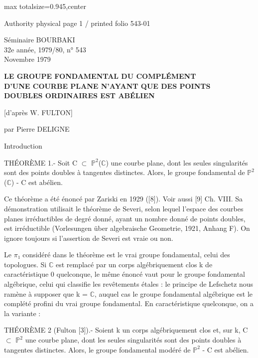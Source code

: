 \documentclass[10pt,a4paper]{article}
\begin{document}
\fontsize{8.05}{9.15}\selectfont
\noindent\begin{adjustbox}{max totalsize={\textwidth}{0.945\textheight},center}
\begin{minipage}{\textwidth}
\noindent\hfill\scriptsize Authority physical page 1 / printed folio 543-01\par\normalsize
\begin{center}Séminaire BOURBAKI\\32e année, 1979/80, n° 543\\Novembre 1979\end{center}
\begin{center}\bfseries LE GROUPE FONDAMENTAL DU COMPLÉMENT\\D'UNE COURBE PLANE N'AYANT QUE DES POINTS\\DOUBLES ORDINAIRES EST ABÉLIEN\end{center}
\begin{center}[d'après W. FULTON]\end{center}
\begin{center}par Pierre DELIGNE\end{center}
\noindent Introduction\par\smallskip
\noindent THÉORÈME 1.- Soit C \ensuremath{⊂} \ensuremath{ℙ^2}(\ensuremath{ℂ}) une courbe plane, dont les seules singularités sont des points doubles à tangentes distinctes. Alors, le groupe fondamental de \ensuremath{ℙ^2}(\ensuremath{ℂ}) - C est abélien.\par\smallskip
\noindent Ce théorème a été énoncé par Zariski en 1929 ([8]). Voir aussi [9] Ch. VIII. Sa démonstration utilisait le théorème de Severi, selon lequel l'espace des courbes planes irréductibles de degré donné, ayant un nombre donné de points doubles, est irréductible (Vorlesungen über algebraische Geometrie, 1921, Anhang F). On ignore toujours si l'assertion de Severi est vraie ou non.\par\smallskip
\noindent Le \ensuremath{π₁} considéré dans le théorème est le vrai groupe fondamental, celui des topologues. Si \ensuremath{ℂ} est remplacé par un corps algébriquement clos k de caractéristique 0 quelconque, le même énoncé vaut pour le groupe fondamental algébrique, celui qui classifie les revêtements étales : le principe de Lefschetz nous ramène à supposer que k = \ensuremath{ℂ}, auquel cas le groupe fondamental algébrique est le complété profini du vrai groupe fondamental. En caractéristique quelconque, on a la variante :\par\smallskip
\noindent THÉORÈME 2 (Fulton [3]).- Soient k un corps algébriquement clos et, sur k, C \ensuremath{⊂} \ensuremath{ℙ^2} une courbe plane, dont les seules singularités sont des points doubles à tangentes distinctes. Alors, le groupe fondamental modéré de \ensuremath{ℙ^2} - C est abélien.\par\smallskip

\end{minipage}
\end{adjustbox}
\end{document}
